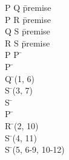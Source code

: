 \documentclass{article}
\begin{document}
\begin{proofbox}
\: P \rightarrow Q \= \hbox{premise} \\
\: \lnot P \rightarrow R \= \hbox{premise} \\
\: Q \rightarrow S \= \hbox{premise} \\
\: R \rightarrow S \= \hbox{premise} \\
\: P \lor \lnot P \= \lem \\
\openAlt
\: P \= \asm \\
\: Q \= \implieselim(1, 6) \\
\: S \= \implieselim(3, 7) \\
\: S \=  \\
\splitAlt
\: \lnot P \= \asm \\
\: R \= \implieselim(2, 10) \\
\: S \= \implieselim(4, 11) \\
\closeAlt
\: S \= \orelim(5, 6-9, 10-12) \\
\end{proofbox}
\end{document}
